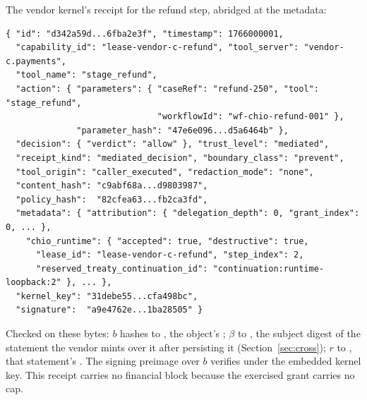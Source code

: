 The vendor kernel's receipt for the refund step, abridged at the metadata:
\begin{lstlisting}
{ "id": "d342a59d...6fba2e3f", "timestamp": 1766000001,
  "capability_id": "lease-vendor-c-refund", "tool_server": "vendor-c.payments",
  "tool_name": "stage_refund",
  "action": { "parameters": { "caseRef": "refund-250", "tool": "stage_refund",
                              "workflowId": "wf-chio-refund-001" },
              "parameter_hash": "47e6e096...d5a6464b" },
  "decision": { "verdict": "allow" }, "trust_level": "mediated",
  "receipt_kind": "mediated_decision", "boundary_class": "prevent",
  "tool_origin": "caller_executed", "redaction_mode": "none",
  "content_hash": "c9abf68a...d9803987",
  "policy_hash":  "82cfea63...fb2ca3fd",
  "metadata": { "attribution": { "delegation_depth": 0, "grant_index": 0, ... },
    "chio_runtime": { "accepted": true, "destructive": true,
      "lease_id": "lease-vendor-c-refund", "step_index": 2,
      "reserved_treaty_continuation_id": "continuation:runtime-loopback:2" }, ... },
  "kernel_key": "31debe55...cfa498bc",
  "signature":  "a9e4762e...1ba28505" }
\end{lstlisting}

\noindent
Checked on these bytes: $b$ hashes to , the
object's ; $\beta$ to , the subject
digest of the statement the vendor mints over it after persisting it
(Section~\ref{sec:cross}); $r$ to , that
statement's . The signing preimage over $b$ verifies
under the embedded kernel key. This receipt carries no financial block because
the exercised grant carries no cap.
